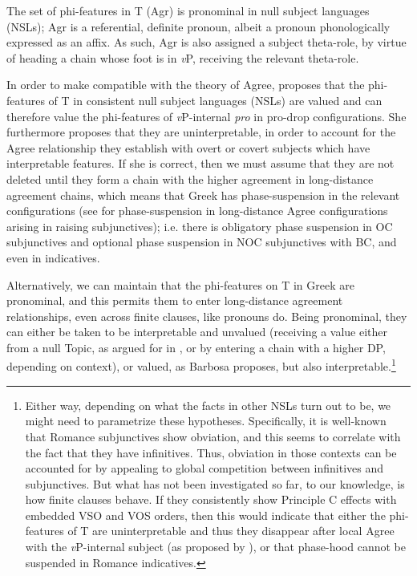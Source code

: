 \documentclass[output=paper]{langsci/langscibook}
\begin{document}
\ea%
    \label{ex:alexiadou:30}
    The set of phi-features in T (Agr) is pronominal in null subject languages (NSLs); Agr is a referential, definite pronoun, albeit a pronoun phonologically expressed as an affix. As such, Agr is also assigned a subject theta-role, by virtue of heading a chain whose foot is in \textit{v}P, receiving the relevant theta-role.
    \z

          

In order to make  compatible with the theory of Agree, \citet{Barbosa2009} proposes that the phi-features of T in consistent null subject languages (NSLs) are valued and can therefore value the phi-features of \textit{v}P-internal \textit{pro} in pro-drop configurations. She furthermore proposes that they are uninterpretable, in order to account for the Agree relationship they establish with overt or covert subjects which have interpretable features. If she is correct, then we must assume that they are not deleted until they form a chain with the higher agreement in long-distance agreement chains, which means that Greek has phase-suspension in the relevant configurations (see \citealt{Alexiadou2014} for phase-suspension in long-distance Agree configurations arising in raising subjunctives); i.e. there is obligatory phase suspension in OC subjunctives and optional phase suspension in NOC subjunctives with BC, and even in indicatives.  

Alternatively, we can maintain that the phi-features on T in Greek are pronominal, and this permits them to enter long-distance agreement relationships, even across finite clauses, like pronouns do. Being pronominal, they can either be taken to be interpretable and unvalued (receiving a value either from a null Topic, as argued for in \citet{Frascarelli2007}, or by entering a chain with a higher DP, depending on context), or valued, as Barbosa proposes, but also interpretable.\footnote{Either way, depending on what the facts in other NSLs turn out to be, we might need to parametrize these hypotheses. Specifically, it is well-known that Romance subjunctives show obviation, and this seems to correlate with the fact that they have infinitives. Thus, obviation in those contexts can be accounted for by appealing to global competition between infinitives and subjunctives. But what has not been investigated so far, to our knowledge, is how finite clauses behave. If they consistently show Principle C effects with embedded VSO and VOS orders, then this would indicate that either the phi-features of T are uninterpretable and thus they disappear after local Agree with the \textit{v}P-internal subject (as proposed by \citealt{Barbosa2009}), or that phase-hood cannot be suspended in Romance indicatives.} 
\end{document}
